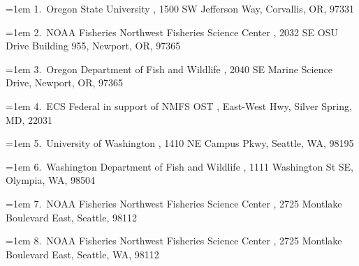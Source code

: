 \documentclass[
]{scrartcl}
\begin{document}
\begin{titlepage}
\begin{minipage}[b][\textheight][s]{\textwidth}

  \vspace{2\baselineskip}

  \hangindent=1em
  {1}.~{Oregon State University}%
  , %
  {1500 SW Jefferson Way, Corvallis, OR, 97331}%
  \par\hangindent=1em%
  {2}.~{NOAA Fisheries Northwest Fisheries Science Center}%
  , %
  {2032 SE OSU Drive Building 955, Newport, OR, 97365}%
  \par\hangindent=1em%
  {3}.~{Oregon Department of Fish and Wildlife}%
  , %
  {2040 SE Marine Science Drive, Newport, OR, 97365}%
  \par\hangindent=1em%
  {4}.~{ECS Federal in support of NMFS OST}%
  , %
  {East-West Hwy, Silver Spring, MD, 22031}%
  \par\hangindent=1em%
  {5}.~{University of Washington}%
  , %
  {1410 NE Campus Pkwy, Seattle, WA, 98195}%
  \par\hangindent=1em%
  {6}.~{Washington Department of Fish and Wildlife}%
  , %
  {1111 Washington St SE, Olympia, WA, 98504}%
  \par\hangindent=1em%
  {7}.~{NOAA Fisheries Northwest Fisheries Science Center}%
  , %
  {2725 Montlake Boulevard East, Seattle, 98112}%
  \par\hangindent=1em%
  {8}.~{NOAA Fisheries Northwest Fisheries Science Center}%
  , %
  {2725 Montlake Boulevard East, Seattle, WA, 98112}%


  \vspace{1\baselineskip}



  \vfill



\end{minipage}
\end{titlepage}
\end{document}
